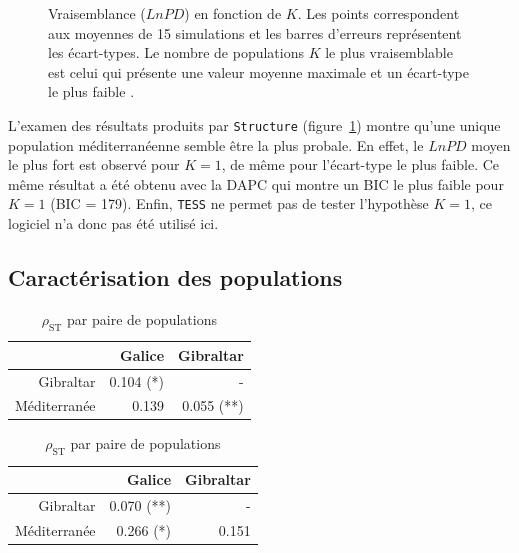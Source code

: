 \documentclass[a4paper,12pt,twoside]{article}\usepackage[]{graphicx}\usepackage[]{color}
\begin{document}
\begin {bibunit} [newbst]
\begin{figure}[htpb]
{}

\caption[Vraisemblance ($LnPD$) en fonction de $K$.]{Vraisemblance ($LnPD$) en fonction de $K$. Les points correspondent aux moyennes de 15 simulations et les barres d'erreurs représentent les écart-types. Le nombre de populations $K$ le plus vraisemblable est celui qui présente une valeur moyenne maximale et un écart-type le plus faible \citep{pritchard2000}.}\label{fig:lnpd2}
\end{figure}




L'examen des résultats produits par \texttt{Structure} (figure~\ref{fig:lnpd2}) montre qu'une unique population méditerranéenne semble être la plus probale. En effet, le $LnPD$ moyen le plus fort est observé pour $K=1$, de même pour l'écart-type le plus faible. Ce même résultat a été obtenu avec la DAPC qui montre un BIC le plus faible pour $K=1$ (BIC = 179). Enfin, \texttt{TESS} ne permet pas de tester l'hypothèse $K=1$, ce logiciel n'a donc pas été utilisé ici.

\subsection{Caractérisation des populations}

\begin{table}[htpb]
\begin{center}
\begin{minipage}{.48\textwidth}
\centering
\caption{$F_\textrm{ST}$ par paire de populations}
\label{table:fst}
\begin{tabular}{rrr}
\toprule
   &   Galice   &    Gibraltar    \\
\midrule
Gibraltar   &   0.104 (*) 	& - \\
Méditerranée   &   0.139 & 0.055 (**) \\
\bottomrule
\end{tabular}

\end{minipage}
\hfill
\begin{minipage}{.48\textwidth}
\centering
\caption{$\rho_\textrm{ST}$ par paire de populations}
\label{table:rho}
\begin{tabular}{rrr}
\toprule
   &   Galice   &    Gibraltar    \\
\midrule
Gibraltar   &   0.070 (**) 	& - \\
Méditerranée   &   0.266 (*) & 0.151 \\
\bottomrule
\end{tabular}


\end{minipage}
\end{center}
\end{table}
\end{bibunit}
\end{document}
